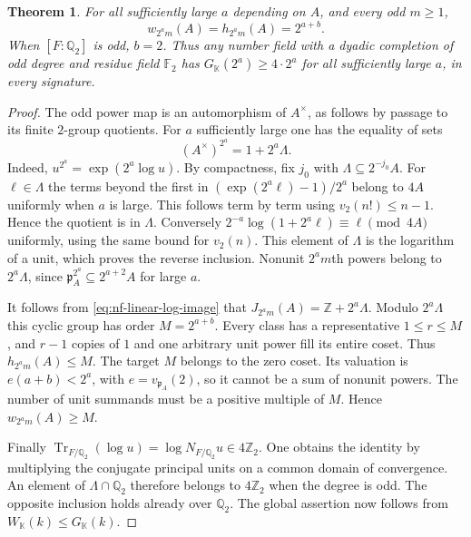 \documentclass[11pt,letterpaper]{article}
\newtheorem{theorem}{Theorem}[section]
\theoremstyle{definition}
\numberwithin{equation}{section}
\begin{document}
\begin{theorem}\label{thm:nf-exact-dyadic}
For all sufficiently large $a$ depending on $A$, and every odd $m\ge1$,
\[
             w_{2^am}(A)=h_{2^am}(A)=2^{a+b}.
\]
When $[F:\mathbb Q_2]$ is odd, $b=2$. Thus any number field with
a dyadic completion of odd degree and residue field $\mathbb F_2$
has $G_{\mathbb K}(2^a)\ge4\cdot2^a$ for all sufficiently large
$a$, in every signature.
\end{theorem}
\begin{proof}
The odd power map is an automorphism of $A^\times$, as follows
by passage to its finite $2$-group quotients. For $a$ sufficiently
large one has the equality of sets
\begin{equation}\label{eq:nf-linear-log-image}
             (A^\times)^{2^a}=1+2^a\Lambda .
\end{equation}
Indeed, $u^{2^a}=\exp(2^a\log u)$. By compactness, fix $j_0$ with
$\Lambda\subseteq2^{-j_0}A$. For $\ell\in\Lambda$ the terms beyond
the first in $(\exp(2^a\ell)-1)/2^a$ belong to $4A$ uniformly when
$a$ is large. This follows term by term using $v_2(n!)\le n-1$.
Hence the quotient is in $\Lambda$. Conversely
$2^{-a}\log(1+2^a\ell)\equiv\ell\pmod{4A}$ uniformly, using the
same bound for $v_2(n)$. This element of $\Lambda$ is the logarithm
of a unit, which proves the reverse inclusion. Nonunit $2^am$th
powers belong to $2^a\Lambda$, since $\mathfrak p_A^{2^a}\subseteq
2^{a+2}A$ for large $a$.

It follows from \eqref{eq:nf-linear-log-image} that
$J_{2^am}(A)=\mathbb Z+2^a\Lambda$. Modulo $2^a\Lambda$ this cyclic
group has order $M=2^{a+b}$. Every class has a representative
$1\le r\le M$, and $r-1$ copies of $1$ and one arbitrary unit
power fill its entire coset. Thus $h_{2^am}(A)\le M$. The target
$M$ belongs to the zero coset. Its valuation is
$e(a+b)<2^a$, with $e=v_{\mathfrak p_A}(2)$, so it cannot be a sum
of nonunit powers. The number of unit summands must be a positive
multiple of $M$. Hence $w_{2^am}(A)\ge M$.

Finally $\operatorname{Tr}_{F/\mathbb Q_2}(\log u)
=\log N_{F/\mathbb Q_2}u\in4\mathbb Z_2$. One obtains the identity
by multiplying the conjugate principal units on a common domain
of convergence. An element of $\Lambda\cap\mathbb Q_2$ therefore
belongs to $4\mathbb Z_2$ when the degree is odd. The opposite
inclusion holds already over $\mathbb Q_2$. The global assertion
now follows from $W_{\mathbb K}(k)\le G_{\mathbb K}(k)$.
\end{proof}
\end{document}
